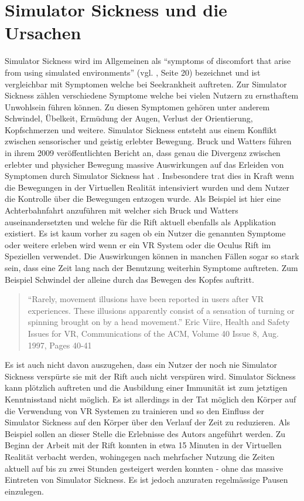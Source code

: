 \documentclass[pagesize, paper=a4, fontsize=12pt,titlepage=true, headings=small, headnosepline, abstractoff, liststotoc, nochapterprefix, plainheadsepline, twoside]{scrreprt}
\begin{document}
\section{Simulator Sickness und die Ursachen}
Simulator Sickness wird im Allgemeinen als "`symptoms of discomfort that arise from using simulated environments"' (vgl. \cite{OculusVR2014}, Seite 20) bezeichnet und ist vergleichbar mit Symptomen welche bei Seekrankheit auftreten.
Zur Simulator Sickness zählen verschiedene Symptome welche bei vielen Nutzern zu ernsthaftem Unwohlsein führen können. Zu diesen Symptomen gehören unter anderem Schwindel, Übelkeit, Ermüdung der Augen, Verlust der Orientierung, Kopfschmerzen und weitere. Simulator Sickness entsteht aus einem Konflikt zwischen sensorischer und geistig erlebter Bewegung. Bruck und Watters führen in ihrem 2009 veröffentlichten Bericht an, dass genau die Divergenz zwischen erlebter und physicher Bewegung massive Auswirkungen auf das Erleiden von Symptomen durch Simulator Sickness hat \cite{BruckWatters2009}. Insbesondere trat dies in Kraft wenn die Bewegungen in der Virtuellen Realität intensiviert wurden und dem Nutzer die Kontrolle über die Bewegungen entzogen wurde. Als Beispiel ist hier eine Achterbahnfahrt anzuführen mit welcher sich Bruck und Watters auseinandersetzten und welche für die Rift aktuell ebenfalls als  Applikation existiert. Es ist kaum vorher zu sagen ob ein Nutzer die genannten Symptome oder weitere erleben wird wenn er ein VR System oder die Oculus Rift im Speziellen verwendet. Die Auswirkungen können in manchen Fällen sogar so stark sein, dass eine Zeit lang nach der Benutzung weiterhin Symptome auftreten. Zum Beispiel Schwindel der alleine durch das Bewegen des Kopfes auftritt.
\begin{quote}
"`Rarely, movement illusions have been reported in users after VR experiences. These illusions apparently consist of a sensation of turning or spinning brought on by a head movement."' Eric Viire, Health and Safety Issues for VR, Communications of the ACM, Volume 40 Issue 8, Aug. 1997, Pages 40-41 
\cite{Viire:1997:HSI:257874.257882}
\end{quote}


Es ist auch nicht davon auszugehen, dass ein Nutzer der noch nie Simulator Sickness verspürte sie mit der Rift auch nicht verspüren wird. Simulator Sickness kann plötzlich auftreten und die Ausbildung einer Immunität ist zum jetztigen Kenntnisstand nicht möglich. Es ist allerdings in der Tat möglich den Körper auf die Verwendung von VR Systemen zu trainieren und so den Einfluss der Simulator Sickness auf den Körper über den Verlauf der Zeit zu reduzieren. Als Beispiel sollen an dieser Stelle die Erlebnisse des Autors angeführt werden. Zu Beginn der Arbeit mit der Rift konnten in etwa 15 Minuten in der Virtuellen Realität verbacht werden, wohingegen nach mehrfacher Nutzung die Zeiten aktuell auf bis zu zwei Stunden gesteigert werden konnten - ohne das massive  Eintreten von Simulator Sickness. Es ist jedoch anzuraten regelmässige Pausen einzulegen.
\end{document}
